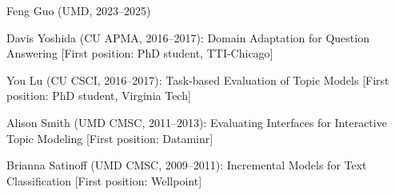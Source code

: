\begin{enumerate*}
  \item Feng Guo (UMD, 2023--2025)
\item Davis Yoshida (CU APMA, 2016--2017): Domain Adaptation for
  Question Answering [First position: PhD student, TTI-Chicago]
\item You Lu (CU CSCI, 2016--2017): Task-based Evaluation of Topic
  Models [First position: PhD student, Virginia Tech]
\item Alison Smith (UMD CMSC, 2011--2013): Evaluating Interfaces for Interactive Topic Modeling [First position: Dataminr]
\item Brianna Satinoff (UMD CMSC, 2009--2011): Incremental Models for Text Classification [First position: Wellpoint]
\end{enumerate*}
